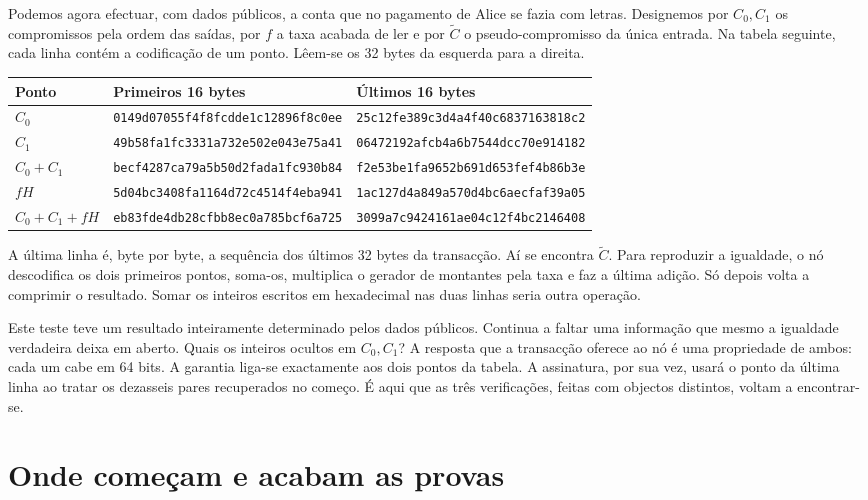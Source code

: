 Podemos agora efectuar, com dados públicos, a conta que no pagamento
de Alice se fazia com letras. Designemos por \(C_0,C_1\) os
compromissos pela ordem das saídas, por \(f\) a taxa acabada de ler
e por \(\widetilde C\) o pseudo-compromisso da única entrada. Na
tabela seguinte, cada linha contém a codificação de um ponto. Lêem-se
os 32 bytes da esquerda para a direita.
\begin{center}\small
\begin{tabular}{@{}l@{\quad}l@{\enspace}l@{}}
\toprule
Ponto & Primeiros 16 bytes & Últimos 16 bytes\\
\midrule
\(C_0\) & \texttt{0149d07055f4f8fcdde1c12896f8c0ee} & \texttt{25c12fe389c3d4a4f40c6837163818c2}\\
\(C_1\) & \texttt{49b58fa1fc3331a732e502e043e75a41} & \texttt{06472192afcb4a6b7544dcc70e914182}\\
\(C_0+C_1\) & \texttt{becf4287ca79a5b50d2fada1fc930b84} & \texttt{f2e53be1fa9652b691d653fef4b86b3e}\\
\(fH\) & \texttt{5d04bc3408fa1164d72c4514f4eba941} & \texttt{1ac127d4a849a570d4bc6aecfaf39a05}\\
\midrule
\(C_0+C_1+fH\) & \texttt{eb83fde4db28cfbb8ec0a785bcf6a725} & \texttt{3099a7c9424161ae04c12f4bc2146408}\\
\bottomrule
\end{tabular}
\end{center}
A última linha é, byte por byte, a sequência dos últimos 32 bytes
da transacção. Aí se encontra \(\widetilde C\). Para reproduzir a
igualdade, o nó descodifica os dois primeiros pontos, soma-os,
multiplica o gerador de montantes pela taxa e faz a última adição.
Só depois volta a comprimir o resultado. Somar os inteiros escritos
em hexadecimal nas duas linhas seria outra operação.

Este teste teve um resultado inteiramente determinado pelos dados
públicos. Continua a faltar uma informação que mesmo a igualdade
verdadeira deixa em aberto. Quais os inteiros ocultos em \(C_0,C_1\)?
A resposta que a transacção oferece ao nó é uma propriedade de ambos:
cada um cabe em 64 bits. A garantia liga-se exactamente aos dois pontos
da tabela. A assinatura, por sua vez, usará o ponto da última linha
ao tratar os dezasseis pares recuperados no começo. É aqui que as
três verificações, feitas com objectos distintos, voltam a encontrar-se.

\section{Onde começam e acabam as provas}

